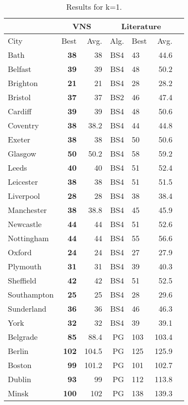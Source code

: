 \documentclass[dvipsnames,format=sigconf,anonymous=true,review=true]{acmart}
\begin{document}
  \begin{table}
  	\caption{Results for k=1.}
  	\label{tab:k1}  
 	\begin{tabular}{l|rr|rlrr}
 	\hline
 	\multicolumn{1}{c}{ } & \multicolumn{2}{|c}{VNS} & \multicolumn{3}{|c}{Literature} \\
 	\hline
	City & Best & Avg. & Alg. & Best & Avg. \\ \hline
	Bath&\bf{38}&38&BS4&43&44.6\\
	Belfast&\bf{39}&39&BS4&48&50.2\\
	Brighton&\bf{21}&21&BS4&28&28.2\\
	Bristol&\bf{37}&37&BS2&46&47.4\\
	Cardiff&\bf{39}&39&BS4&48&50.6\\
	Coventry&\bf{38}&38.2&BS4&44&44.8\\
	Exeter&\bf{38}&38&BS4&50&50.6\\
	Glasgow&\bf{50}&50.2&BS4&58&59.2\\
	Leeds&\bf{40}&40&BS4&51&52.4\\
	Leicester&\bf{38}&38&BS4&51&51.5\\
	Liverpool&\bf{28}&28&BS4&38&38.4\\
	Manchester&\bf{38}&38.8&BS4&45&45.9\\
	Newcastle&\bf{44}&44&BS4&51&52.6\\
	Nottingham&\bf{44}&44&BS4&55&56.6\\
	Oxford&\bf{24}&24&BS4&27&27.9\\
	Plymouth&\bf{31}&31&BS4&39&40.3\\
	Sheffield&\bf{42}&42&BS4&51&52.5\\
	Southampton&\bf{25}&25&BS4&28&29.6\\
	Sunderland&\bf{36}&36&BS4&46&46.3\\
	York&\bf{32}&32&BS4&39&39.1\\  \hline  \hline
	Belgrade&\bf{85}&88.4&PG&103&103.4\\
	Berlin&\bf{102}&104.5&PG&125&125.9\\
	Boston&\bf{99}&101.2&PG&101&102.7\\
	Dublin&\bf{93}&99&PG&112&113.8\\
	Minsk&\bf{100}&102&PG&138&139.3\\
	\hline
	
 	\end{tabular}
 \end{table}
\end{document}
